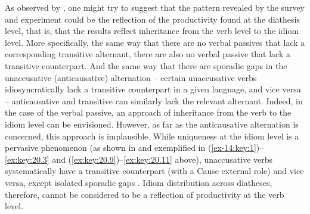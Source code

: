 \documentclass[output=paper]{langsci/langscibook}
\begin{document}
As observed by \textcite{SilHorKluWex2018}, one might try to suggest that the
pattern revealed by the survey and experiment could be the reflection of the
productivity found at the diathesis level, that is, that the results reflect
inheritance from the verb level to the idiom level. More specifically, the same
way that there are no verbal passives that lack a corresponding transitive
alternant, there are also no verbal passive  that lack a transitive
counterpart. And the same way that there are sporadic gaps in the unaccusative
(anticausative) alternation – certain unaccusative verbs
idiosyncratically lack a transitive counterpart in a given language, and vice
versa – anticausative and transitive  can similarly lack the
relevant alternant. Indeed, in the case of the verbal passive, an
approach of inheritance from the verb to the idiom level can be envisioned.
However, as far as the anticausative alternation is concerned, this approach is
implausible. While uniqueness at the idiom level is a pervasive
phenomenon (as shown in  and exemplified in
(\ref{ex-14:key:1})--\eqref{ex:key:20.3} and
(\ref{ex:key:20.9})--\eqref{ex:key:20.11} above),
unaccusative verbs systematically have a transitive
counterpart (with a Cause external role) and vice versa, except isolated
sporadic gaps \parencite{Haspelmath1993,Reinhart2002}.  Idiom distribution
across diatheses, therefore, cannot be considered to be a reflection of
productivity at the verb level.
\end{document}
